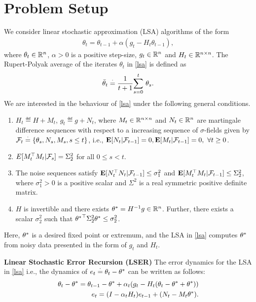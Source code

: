 \section{Problem Setup}

We consider linear stochastic approximation (LSA) algorithms of the form
\begin{align}\label{lsa}
\theta_{t}=\theta_{t-1}+\alpha(g_t-H_t\theta_{t-1}),
\end{align}
where $\theta_t\in \R^n$, $\alpha>0$ is a positive step-size, $g_t\in \R^n$ and $H_t\in \R^{n\times n}$. The Rupert-Polyak average of the iterates $\theta_t$ in \eqref{lsa} is defined as
\begin{align}\label{rp} \tb_t\eqdef \frac{1}{t+1}\ous{\sum}{s=0}{t} \theta_s. \end{align}
We are interested in the behaviour of \eqref{lsa} under the following general conditions.
\begin{assumption}\label{genlsa}
\begin{enumerate}
\item\label{mart} $H_t\eqdef H+M_t$, $g_t\eqdef g+N_t$, where $M_t\in \R^{n\times n}$ and $N_t\in \R^n$ are martingale difference sequences with respect to a increasing sequence of $\sigma$-fields given by $\F_t\eqdef \{\theta_s, N_s,M_s,s\leq t\}$, i.e., $\E[N_t|\F_{t-1}]=0,\E[M_t|\F_{t-1}]=0,~\forall t\geq 0$.
\item \label{secondmom} $E[M_t^\top M_t| \F_{s}]=\Sigma_2^2$ for all $0\leq s< t$.
\item \label{noise} The noise sequences satisfy $\E[N_t^\top N_t|\F_{t-1}]\leq \sigma_1^2$ and $\E[M_t^\top M_t|\F_{t-1}]\leq \Sigma_2^2$, where $\sigma_1^2>0$ is a positive scalar and $\Sigma^2$ is a real symmetric positive definite matrix.
\item \label{mat} $H$ is invertible and there exists $\ts=H^{-1}g\in\R^n$. Further, there exists a scalar $\sigma_2^2$ such that ${\ts}^\top\Sigma_2^2\ts\leq \sigma_2^2$.
\end{enumerate}
\end{assumption}
Here, $\ts$ is a desired fixed point or extremum, and the LSA in \eqref{lsa} computes $\ts$ from noisy data presented in the form of $g_t$ and $H_t$.\par
\textbf{Linear Stochastic Error Recursion (LSER)} The error dynamics for the LSA in \eqref{lsa} i.e., the dynamics of $e_t\eqdef\theta_t-\ts$ can be written as follows:
\begin{align}\label{errprelim}
\theta_t-\ts=\theta_{t-1}-\ts+\alpha_t(g_t -H_t(\theta_t-\ts+\ts))\nn\\
e_t=(I-\alpha_t H_t)e_{t-1}+(N_t-M_t\ts).
\end{align}
